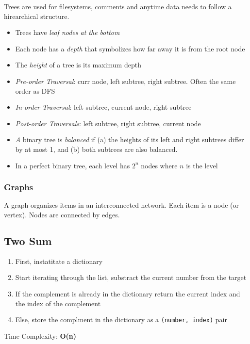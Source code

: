 \documentclass{article}
\begin{document}
Trees are used for filesystems, comments and anytime data needs to follow a hirearchical structure.

\begin{itemize}
\item Trees have \textit{leaf nodes at the bottom}
\item Each node has a \textit{depth} that symbolizes how far away it is from the root node
\item The \textit{height} of a tree is its maximum depth
\item \textit{Pre-order Traversal}: curr node, left subtree, right subtree. Often the same order as DFS 
\item \textit{In-order Traversal}: left subtree, current node, right subtree
\item \textit{Post-order Traversals}: left subtree, right subtree, current node
\item \textit A binary tree is \textit{balanced} if (a) the heights of its left and right subtrees differ by at most 1, and (b) both subtrees are also balanced. 
\item In a perfect binary tree, each level has $2^n$ nodes where $n$ is the level
\end{itemize}

\subsubsection{Graphs}

A graph organizes items in an interconnected network. Each item is a node (or vertex). Nodes are connected by edges.



\subsection{Two Sum}
\begin{enumerate}
\item First, instatitate a dictionary
\item Start iterating through the list, substract the current number from the target
\item If the complement is already in the dictionary return the current index and the index of the complement
\item Else, store the complment in the dictionary as a \lstinline{(number, index)} pair
\end{enumerate}

Time Complexity: \textbf{O(n)}
\end{document}
